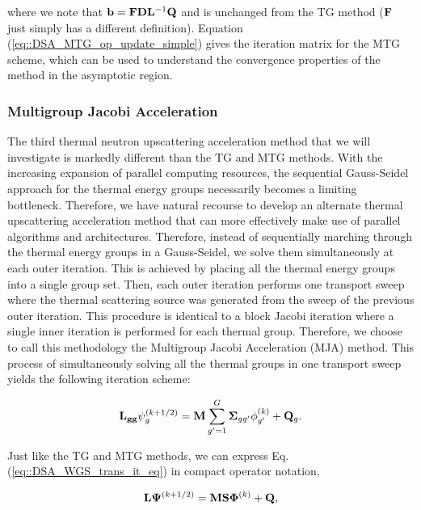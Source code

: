 \noindent where we note that ${\bf b}={\bf F} {\bf D}{\bf L}^{-1}  {\bf Q}$ and is unchanged from the TG method (${\bf F}$ just simply has a different definition). Equation (\ref{eq::DSA_MTG_op_update_simple}) gives the iteration matrix for the MTG scheme, which can be used to understand the convergence properties of the method in the asymptotic region. 

\subsubsection{Multigroup Jacobi Acceleration}
\label{sec:DSA_DSA_MG_WGS}

The third thermal neutron upscattering acceleration method that we will investigate is markedly different than the TG and MTG methods. With the increasing expansion of parallel computing resources, the sequential Gauss-Seidel approach for the thermal energy groups necessarily becomes a limiting bottleneck. Therefore, we have natural recourse to develop an alternate thermal upscattering acceleration method that can more effectively make use of parallel algorithms and architectures. Therefore, instead of sequentially marching through the thermal energy groups in a Gauss-Seidel, we solve them simultaneously at each outer iteration. This is achieved by placing all the thermal energy groups into a single group set. Then, each outer iteration performs one transport sweep where the thermal scattering source was generated from the sweep of the previous outer iteration. This procedure is identical to a block Jacobi iteration where a single inner iteration is performed for each thermal group. Therefore, we choose to call this methodology the Multigroup Jacobi Acceleration (MJA) method. This process of simultaneously solving all the thermal groups in one transport sweep yields the following iteration scheme:

\begin{equation}
\label{eq::DSA_WGS_trans_it_eq}
{\bf L_{gg}} \psi_g^{(k+1/2)} =  {\bf M} \sum_{g'=1}^G {\bf \Sigma}_{g g'} \phi_{g'}^{(k)} + {\bf Q}_g .
\end{equation}

\noindent Just like the TG and MTG methods, we can express Eq. (\ref{eq::DSA_WGS_trans_it_eq}) in compact operator notation,

\begin{equation}
\label{eq::DSA_WGS_trans_it_eq_ops}
{\bf L} {\bf \Psi}^{(k+1/2)} = {\bf M} {\bf S}  {\bf \Phi}^{(k)} + {\bf Q} ,
\end{equation}

